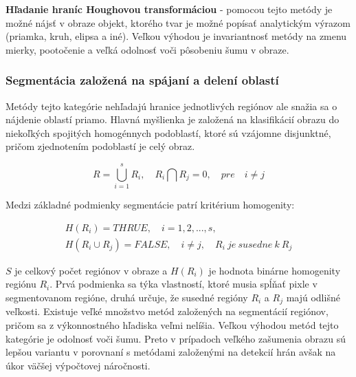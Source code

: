 \textbf{Hľadanie hraníc Houghovou transformáciou} \cite{houghova_transformacia} - pomocou tejto metódy je možné nájsť v obraze objekt, ktorého tvar je možné popísať analytickým výrazom (priamka, kruh, elipsa a iné). Veľkou výhodou je invariantnosť metódy na zmenu mierky, pootočenie a veľká odolnosť voči pôsobeniu šumu v obraze. \cite{houghova_transformacia} 

\subsubsection{Segmentácia založená na spájaní a delení oblastí}
Metódy tejto kategórie nehľadajú hranice jednotlivých regiónov ale snažia sa o nájdenie oblastí priamo. Hlavná myšlienka je založená na klasifikácií obrazu do niekoľkých spojitých homogénnych podoblastí, ktoré sú vzájomne disjunktné, pričom zjednotením podoblastí je celý obraz. \cite{pocitacove_videnie_v_praxi}

\begin{equation}
    R=\bigcup_{i=1}^s R_i{,}\quad R_i\bigcap R_j=0{,}\quad{pre}\quad i\neq j
\end{equation}

Medzi základné podmienky segmentácie patrí kritérium homogenity:

\begin{equation}
    \begin{gathered}
        H(R_i)={THRUE}{,}\quad \textit{i}=1{,}2{,}{...}{,}s{,}\\ 
        H(R_i \cup R_j)={FALSE}{,}\quad \textit{i} \neq \textit{j}{,}\quad R_i { \ je \ susedne \ k \ } R_j
    \end{gathered}
\end{equation}

$S$ je celkový počet regiónov v obraze a $H(R_i)$ je hodnota binárne homogenity regiónu $R_i$. Prvá podmienka sa týka vlastností, ktoré musia spĺňať pixle v segmentovanom regióne, druhá určuje, že susedné regióny $R_i$ a $R_j$ majú odlišné veľkosti. Existuje veľké množstvo metód založených na segmentácií regiónov, pričom sa z výkonnostného hľadiska veľmi nelíšia. Veľkou výhodou metód tejto kategórie je odolnosť voči šumu. Preto v prípadoch veľkého zašumenia obrazu sú lepšou variantu v porovnaní s metódami založenými na detekcií hrán avšak na úkor väčšej výpočtovej náročnosti. \cite{pocitacove_videnie_v_praxi}

